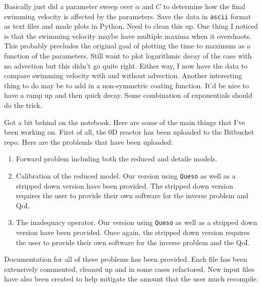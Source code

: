 Basically just did a parameter sweep over $\alpha$ and $C$ to determine how the final swimming velocity is affected by the parameters.  Save the data in \texttt{ascii} format as text files and made plots in Python.  Need to clean this up.  One thing I noticed is that the swimming velocity maybe have multiple maxima when it overshoots.  This probably precludes the original goal of plotting the time to maximum as a function of the parameters.  Still want to plot logarithmic decay of the case with no advection but this didn't go quite right.  Either way, I now have the data to compare swimming velocity with and without advection.  Another interesting thing to do may be to add in a non-symmetric coating function.  It'd be nice to have a ramp up and then quick decay.  Some combination of exponentials should do the trick.

Got a bit behind on the notebook.  Here are some of the main things that I've been working on.  First of all, the 0D reactor has been uploaded to the Bitbucket repo.  Here are the problemls that have been uploaded:
\begin{enumerate}
  \item Forward problem including both the reduced and detaile models.
  \item Calibration of the reduced model.  Our version using \texttt{Queso} as well as a stripped down version have been provided.  The stripped down version requires the user to provide their own software for the inverse problem and QoI.
  \item The inadequacy operator.  Our version using \texttt{Queso} as well as a stripped down version have been provided.  Once again, the stripped down version requires the user to provide their own software for the inverse problem and the QoI.
\end{enumerate}
Documentation for all of these problems has been provided.  Each file has been extensively commented, cleaned up and in some cases refactored.  New input files have also been created to help mitigate the amount that the user much recompile.

